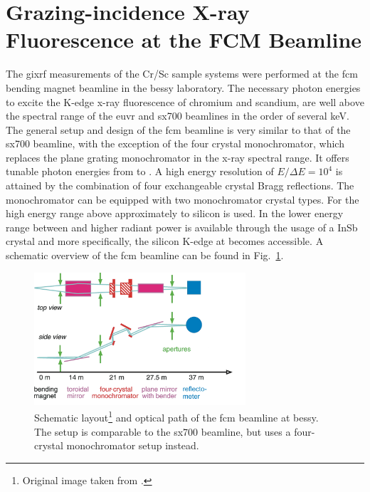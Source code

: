 \section{Grazing-incidence X-ray Fluorescence at the FCM Beamline} \label{ch_exp:sec_xrf_at_fcm}
The \gls{gixrf} measurements of the Cr/Sc sample systems were performed at the \gls{fcm} bending magnet beamline \cite{krumrey_design_1998} in the \gls{bessy} laboratory. The necessary photon energies to excite the K-edge x-ray fluorescence of chromium and scandium, are well above the spectral range of the \gls{euvr} and \gls{sx700} beamlines in the order of several \si{\kilo\electronvolt}. The general setup and design of the \gls{fcm} beamline is very similar to that of the \gls{sx700} beamline, with the exception of the four crystal monochromator, which replaces the plane grating monochromator in the x-ray spectral range. It offers tunable photon energies from  to . A high energy resolution of $E/\Delta E = 10^4$ is attained by the combination of four exchangeable crystal Bragg reflections. The monochromator can be equipped with two monochromator crystal types. For the high energy range above approximately  to  silicon is used. In the lower energy range between  and  higher radiant power is available through the usage of a InSb crystal and more specifically, the silicon K-edge at  becomes accessible. A schematic overview of the \gls{fcm} beamline can be found in Fig.~\ref{ch_exp:fig_fcm_scheme}.
\begin{figure}[htb]
        \includegraphics[width=0.7\textwidth]{img/FCMScheme.png}
        \caption[FCM beamline scheme.]{%
            Schematic layout\footnote{Original image taken from \textcite{krumrey_design_1998}.} and optical path of the \gls{fcm} beamline at \gls{bessy}. The setup is comparable to the \gls{sx700} beamline, but uses a four-crystal monochromator setup instead.}
        \label{ch_exp:fig_fcm_scheme}
\end{figure}

